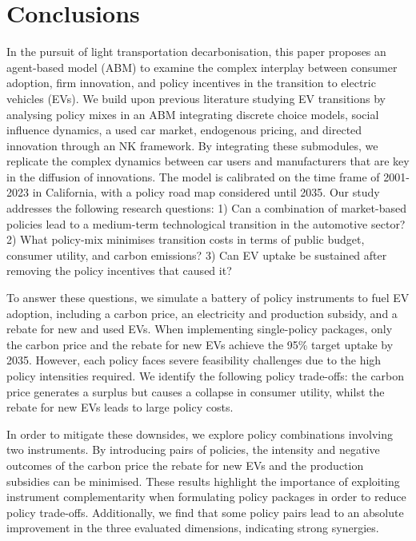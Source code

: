 \documentclass[12pt]{article}
\begin{document}
	\section{Conclusions} \label{Sec_concl}
	In the pursuit of light transportation decarbonisation, this paper proposes an agent-based model (ABM) to examine the complex interplay between consumer adoption, firm innovation, and policy incentives in the transition to electric vehicles (EVs). We build upon previous literature studying EV transitions by analysing policy mixes in an ABM integrating discrete choice models, social influence dynamics, a used car market, endogenous pricing, and directed innovation through an NK framework. By integrating these submodules, we replicate the complex dynamics between car users and manufacturers that are key in the diffusion of innovations. The model is calibrated on the time frame of 2001-2023 in California, with a policy road map considered until 2035. Our study addresses the following research questions: 1) Can a combination of market-based policies lead to a medium-term technological transition in the automotive sector? 2) What policy-mix minimises transition costs in terms of public budget, consumer utility, and carbon emissions? 3) Can EV uptake be sustained after removing the policy incentives that caused it?

	To answer these questions, we simulate a battery of policy instruments to fuel EV adoption, including a carbon price, an electricity and production subsidy, and a rebate for new and used EVs. When implementing single-policy packages, only the carbon price and the rebate for new EVs achieve the 95\% target uptake by 2035. However, each policy faces severe feasibility challenges due to the high policy intensities required. We identify the following policy trade-offs: the carbon price generates a surplus but causes a collapse in consumer utility, whilst the rebate for new EVs leads to large policy costs.

	In order to mitigate these downsides, we explore policy combinations involving two instruments. By introducing pairs of policies, the intensity and negative outcomes of the carbon price the rebate for new EVs and the production subsidies can be minimised. These results highlight the importance of exploiting instrument complementarity when formulating policy packages in order to reduce policy trade-offs. Additionally, we find that some policy pairs lead to an absolute improvement in the three evaluated dimensions, indicating strong synergies.
\end{document}
